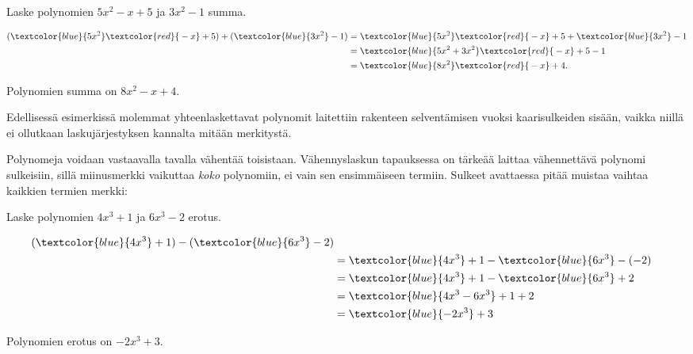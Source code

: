 \begin{esimerkki}
Laske polynomien $5x^2-x+5$ ja $3x^2-1$ summa.
    \begin{esimratk}
    
        \begin{align*}
            (\textcolor{blue}{5x^2} \textcolor{red}{{}-x} + 5) + (\textcolor{blue}{3x^2} -1) 
            &=\textcolor{blue}{5x^2} \textcolor{red}{{}-x} + 5 + \textcolor{blue}{3x^2} -1 \\
            &=\textcolor{blue}{5x^2+3x^2} \textcolor{red}{{}-x} +5-1\\
            &=\textcolor{blue}{8x^2} \textcolor{red}{{}-x}+4.
        \end{align*}     
    \end{esimratk}
    \begin{esimvast}
        Polynomien summa on $8x^2-x+4$.
    \end{esimvast}
\end{esimerkki}

Edellisessä esimerkissä molemmat yhteenlaskettavat polynomit laitettiin rakenteen selventämisen vuoksi kaarisulkeiden sisään, vaikka niillä ei ollutkaan laskujärjestyksen kannalta mitään merkitystä.

Polynomeja voidaan vastaavalla tavalla vähentää toisistaan. Vähennyslaskun tapauksessa on tärkeää laittaa vähennettävä polynomi sulkeisiin, sillä miinusmerkki vaikuttaa \emph{koko} polynomiin, ei vain sen ensimmäiseen termiin. Sulkeet avattaessa pitää muistaa vaihtaa kaikkien termien merkki: 

\begin{esimerkki}
    Laske polynomien $4x^3+1$ ja $6x^3-2$ erotus.
    \begin{esimratk}
        \begin{align*}
		(\textcolor{blue}{4x^3}+1)-(\textcolor{blue}{6x^3}-2) \\
		&= \textcolor{blue}{4x^3}+1 - \textcolor{blue}{6x^3} -(-2) \\
		&= \textcolor{blue}{4x^3}+1 - \textcolor{blue}{6x^3} + 2 \\
		&= \textcolor{blue}{4x^3-6x^3} +1 +2 \\
		&=\textcolor{blue}{-2x^3}+3
        \end{align*}
    \end{esimratk}
    \begin{esimvast}
        Polynomien erotus on $-2x^3+3$.
    \end{esimvast}
\end{esimerkki}

